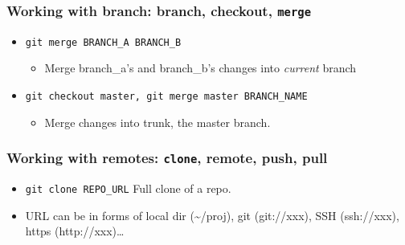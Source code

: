 \documentclass[11pt,ignorenonframetext,]{beamer}
\begin{document}
\begin{frame}[fragile]\frametitle{Working with \textbf{branch}: branch,
checkout, \texttt{merge}}

\begin{itemize}
\item
  \texttt{git merge BRANCH\_A BRANCH\_B} 
   \begin{itemize}
   \item
     Merge branch\_a's and branch\_b's changes into \emph{current} branch
   \end{itemize}
\item
  \texttt{git checkout master, git merge master BRANCH\_NAME} 
   \begin{itemize}
   \item
     Merge changes into trunk, the master branch.
   \end{itemize}
\end{itemize}
\end{frame}

\begin{frame}[fragile, label=gitremote]\frametitle{Working with \textbf{remotes}:
\texttt{clone}, remote, push, pull}

\begin{itemize}
\item
  \texttt{git clone REPO\_URL} Full clone of a repo.
\item
  URL can be in forms of local dir (\textasciitilde{}/proj), git
  (git://xxx), SSH (ssh://xxx), https (http://xxx)\ldots{}
\end{itemize}
\end{frame}
\end{document}
